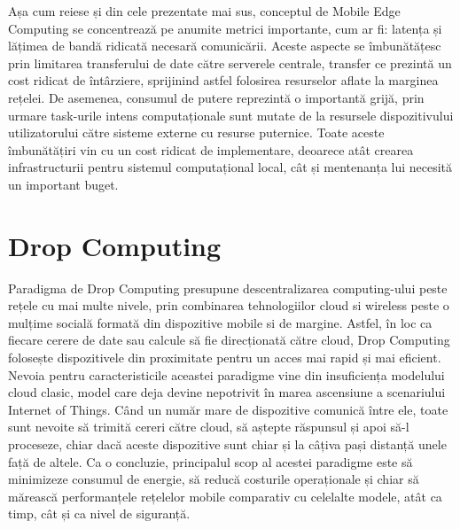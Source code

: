 \documentclass[12pt,a4paper]{report}
\begin{document}
Așa cum reiese și din cele prezentate mai sus, conceptul de Mobile Edge Computing se concentrează pe anumite metrici importante, cum ar fi: latența și lățimea de bandă ridicată necesară comunicării. Aceste aspecte se îmbunătățesc prin limitarea transferului de date către serverele centrale, transfer ce prezintă un cost ridicat de întârziere, sprijinind astfel folosirea resurselor aflate la marginea rețelei. De asemenea, consumul de putere reprezintă o importantă grijă, prin urmare task-urile intens computaționale sunt mutate de la resursele dispozitivului utilizatorului către sisteme externe cu resurse puternice. Toate aceste îmbunătățiri vin cu un cost ridicat de implementare, deoarece atât crearea infrastructurii pentru sistemul computațional local, cât și mentenanța lui necesită un important buget. 

\section{Drop Computing} \label{dropComputing}
Paradigma de Drop Computing\cite{DC} presupune descentralizarea computing-ului peste rețele cu mai multe nivele, prin combinarea tehnologiilor cloud si wireless peste o mulțime socială formată din dispozitive mobile si de margine. Astfel, în loc ca fiecare cerere de date sau calcule să fie direcționată către cloud, Drop Computing folosește dispozitivele din proximitate pentru un acces mai rapid și mai eficient. Nevoia pentru caracteristicile aceastei paradigme vine din insuficiența modelului cloud clasic, model care deja devine nepotrivit în marea ascensiune a scenariului Internet of Things. Când un număr mare de dispozitive comunică între ele, toate sunt nevoite să trimită cereri către cloud, să aștepte răspunsul și apoi să-l proceseze, chiar dacă aceste dispozitive sunt chiar și la câțiva pași distanță unele față de altele.
Ca o concluzie, principalul scop al acestei paradigme este să minimizeze consumul de energie, să reducă costurile operaționale și chiar să mărească performanțele rețelelor mobile comparativ cu celelalte modele, atât ca timp, cât și ca nivel de siguranță.
	
\end{document}
